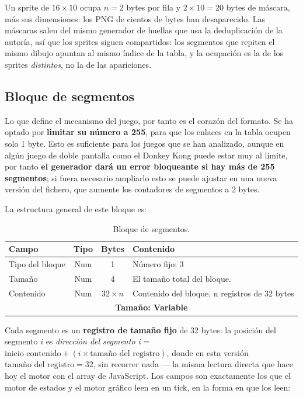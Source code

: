 Un sprite de $16 \times 10$ ocupa $n = 2$ bytes por fila y
$2 \times 10 = 20$ bytes de máscara, más sus dimensiones: los PNG
de cientos de bytes han desaparecido. Las máscaras salen del mismo
generador de huellas que usa la deduplicación de la autoría, así
que los sprites siguen compartidos: los segmentos que repiten el
mismo dibujo apuntan al mismo índice de la tabla, y la ocupación es
la de los sprites \emph{distintos}, no la de las apariciones.

\subsection{Bloque de segmentos}
\label{sec:F5I2Blsegmentos}

Lo que define el mecanismo del juego, por tanto es el corazón del formato. Se ha optado por \textbf{limitar su número a 255}, para que los enlaces en la tabla ocupen solo 1 byte. Esto es suficiente para los juegos que se han analizado, aunque en algún juego de doble pantalla como el Donkey Kong puede estar muy al límite, por tanto \textbf{el generador dará un error bloqueante si hay más de 255 segmentos}; si fuera necesario ampliarlo esto se puede ajustar en una nueva versión del fichero, que aumente los contadores de segmentos a 2 bytes.

La estructura general de este bloque es:

\begin{table}[H]
	\centering
	\begin{tabular}{|l|c|c|p{8.4cm}|}
		\hline
		\textbf{Campo} & \textbf{Tipo} & \textbf{Bytes} & \textbf{Contenido} \\
		\hline
		
		Tipo del bloque & Num & 1 & Número fijo: 3\\ \hline
		
		Tamaño & Num & 4 & El tamaño total del bloque. \\ \hline
		
		Contenido & Num & $32 \times n$ & Contenido del bloque, n registros de 32 bytes\\
		
		\hline\hline
		\multicolumn{4}{c}{\textbf{Tamaño: Variable}} \\ \hline
	\end{tabular}
	\caption{Bloque de segmentos.}
	\label{tab:bloqueSegmentos}
\end{table}

Cada segmento es un \textbf{registro de tamaño fijo} de 32 bytes: la posición del segmento
$i$ es \emph{dirección del segmento i} = $\text{inicio contenido} + (i \times \text{tamaño del registro})$, donde en esta versión $\text{tamaño del registro} = 32$, sin
recorrer nada — la misma lectura directa que hace hoy el motor con el array
de JavaScript. Los campos son exactamente los que el motor de estados y el
motor gráfico leen en un tick, en la forma en que los leen:

